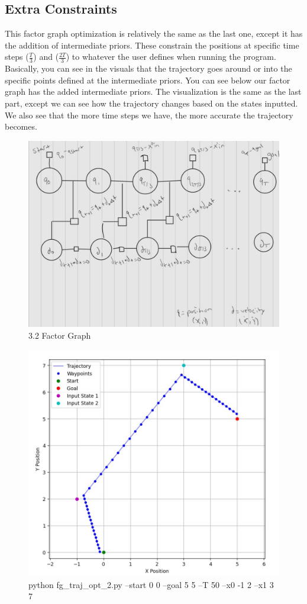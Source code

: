 \documentclass{article}
\begin{document}
\subsection{Extra Constraints}
This factor graph optimization is relatively the same as the last one, except it has the addition of intermediate priors. These constrain the positions at specific time steps ($\frac{T}{3}$) and ($\frac{2T}{3}$) to whatever the user defines when running the program. Basically, you can see in the visuals that the trajectory goes around or into the specific points defined at the intermediate priors. You can see below our factor graph has the added intermediate priors. The visualization is the same as the last part, except we can see how the trajectory changes based on the states inputted. We also see that the more time steps we have, the more accurate the trajectory becomes. 

\begin{figure} [H]
    \centering
    \includegraphics[width=0.5\linewidth]{latex_media/fg_traj_opt_constrained_factorGraph.jpg}
    \caption{3.2 Factor Graph}
    \label{fig:enter-label}
\end{figure}

\begin{figure} [H]
    \centering
    \includegraphics[width=0.5\linewidth]{latex_media/fg_traj_opt_constrained_1.jpg}
    \caption{python fg\_traj\_opt\_2.py --start 0 0 --goal 5 5 --T 50 --x0 -1 2 --x1 3 7}
    
\end{figure}
\end{document}
